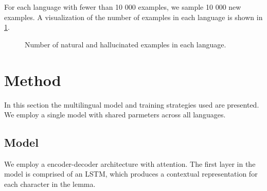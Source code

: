 \documentclass[11pt,a4paper]{article}
\begin{document}
For each language with fewer
than 10 000 examples, we sample 10 000 new examples. A visualization
of the number of examples in each language is shown in
\cref{fig:data}.

\begin{figure}[ht]
\caption{\label{fig:data} Number of natural and hallucinated examples in each language.}
\end{figure}




\section{Method}

In this section the multilingual model and training strategies used
are presented. We employ a single model with shared parmeters
across all languages. 

\subsection{Model}

We employ a encoder-decoder architecture with attention. The first
layer in the model is comprised of an LSTM, which produces a
contextual representation for each character in the lemma.
\end{document}
